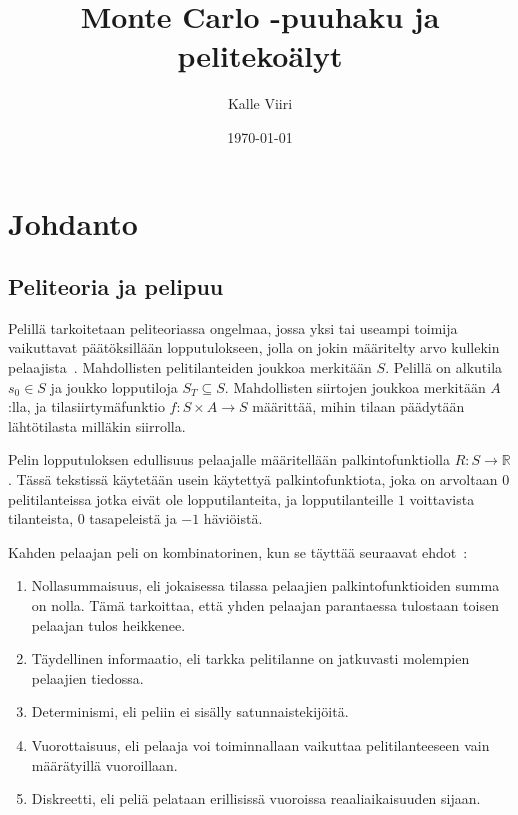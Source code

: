 \documentclass[12pt,finnish]{tktltiki2}
\title{Monte Carlo -puuhaku ja pelitekoälyt}
\author{Kalle Viiri}
\date{\today}
\theoremstyle{definition}
\theoremstyle{remark}
\begin{document}

\frontmatter      %

\maketitle        %
\makeabstract     %

\tableofcontents  %


\mainmatter       %

\section{Johdanto}

\subsection{Peliteoria ja pelipuu}

Pelillä tarkoitetaan peliteoriassa ongelmaa, jossa yksi tai useampi toimija vaikuttavat päätöksillään lopputulokseen, jolla on jokin määritelty arvo kullekin pelaajista~\cite{browne}. Mahdollisten pelitilanteiden joukkoa merkitään $S$. Pelillä on alkutila $s_0 \in S$ ja joukko lopputiloja $S_T \subseteq S$. Mahdollisten siirtojen joukkoa merkitään $A$:lla, ja tilasiirtymäfunktio $f : S \times A \rightarrow S$ määrittää, mihin tilaan päädytään lähtötilasta milläkin siirrolla.

Pelin lopputuloksen edullisuus pelaajalle määritellään palkintofunktiolla $R : S \rightarrow \mathbb{R}$. Tässä tekstissä käytetään usein käytettyä palkintofunktiota, joka on arvoltaan $0$ pelitilanteissa jotka eivät ole lopputilanteita, ja lopputilanteille $1$ voittavista tilanteista, $0$ tasapeleistä ja $-1$ häviöistä.

Kahden pelaajan peli on kombinatorinen, kun se täyttää seuraavat ehdot~\cite{browne}:

\begin{enumerate}[label=\roman*.]
	\item Nollasummaisuus, eli jokaisessa tilassa pelaajien palkintofunktioiden summa on nolla. Tämä tarkoittaa, että yhden pelaajan parantaessa tulostaan toisen pelaajan tulos heikkenee.
	 \item Täydellinen informaatio, eli tarkka pelitilanne on jatkuvasti molempien pelaajien tiedossa.
	 \item Determinismi, eli peliin ei sisälly satunnaistekijöitä.
	 \item Vuorottaisuus, eli pelaaja voi toiminnallaan vaikuttaa pelitilanteeseen vain määrätyillä vuoroillaan.
	 \item Diskreetti, eli peliä pelataan erillisissä vuoroissa reaaliaikaisuuden sijaan.
\end{enumerate}
\end{document}
